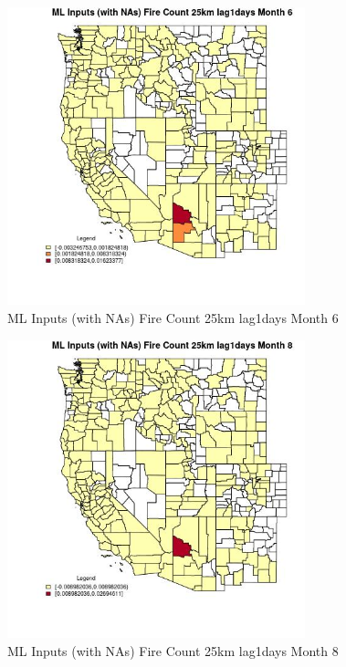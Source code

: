 \begin{figure} 
\centering  
\includegraphics[width=0.77\textwidth]{Code_Outputs/Report_ML_input_PM25_Step4_part_e_de_duplicated_aves_compiled_2019-05-20wNAs_CountyFire_Count_25km_lag1daysmedianMonth6.jpg} 
\caption{\label{fig:Report_ML_input_PM25_Step4_part_e_de_duplicated_aves_compiled_2019-05-20wNAsCountyFire_Count_25km_lag1daysmedianMonth6}ML Inputs (with NAs) Fire Count 25km lag1days Month 6} 
\end{figure} 
 

\begin{figure} 
\centering  
\includegraphics[width=0.77\textwidth]{Code_Outputs/Report_ML_input_PM25_Step4_part_e_de_duplicated_aves_compiled_2019-05-20wNAs_CountyFire_Count_25km_lag1daysmedianMonth8.jpg} 
\caption{\label{fig:Report_ML_input_PM25_Step4_part_e_de_duplicated_aves_compiled_2019-05-20wNAsCountyFire_Count_25km_lag1daysmedianMonth8}ML Inputs (with NAs) Fire Count 25km lag1days Month 8} 
\end{figure} 
 

